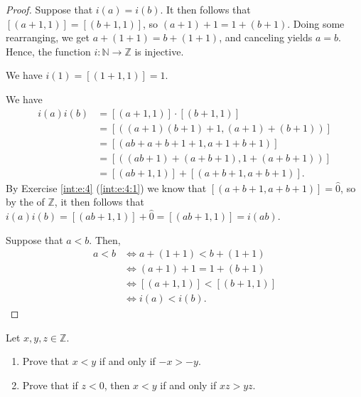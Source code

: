 \begin{proof}
	\hfill

	Suppose that $i(a) = i(b)$. It then follows that $[(a + 1, 1)] = [(b + 1, 1)]$, so $(a + 1) + 1 = 1 + (b + 1)$. Doing some rearranging, we get $a + (1 + 1) = b + (1 + 1)$, and canceling yields $a = b$. Hence, the function $i: \mathbb{N} \to \mathbb{Z}$ is injective.

	We have $i(1) = [(1 + 1, 1)] = \hat{1}$.

	We have
	\begin{align*}
		i(a)i(b) & = [(a + 1, 1)] \cdot [(b + 1, 1)]             \\
		         & = [((a + 1)(b + 1) + 1, (a + 1) + (b + 1))]   \\
		         & = [(ab + a + b + 1 + 1, a + 1 + b + 1)]       \\
		         & = [((ab + 1) + (a + b + 1), 1 + (a + b + 1))] \\
		         & = [(ab + 1, 1)] + [(a + b + 1, a + b + 1)].
	\end{align*}
	By Exercise \ref{int:e:4} (\ref{int:e:4:1}) we know that $[(a + b + 1, a + b + 1)] = \hat{0}$, so by the  of $\mathbb{Z}$, it then follows that $i(a)i(b) = [(ab + 1, 1)] + \hat{0} = [(ab + 1, 1)] = i(ab)$.

	Suppose that $a < b$. Then,
	\begin{align*}
		a < b & \iff a + (1 + 1) < b + (1 + 1)   \\
		      & \iff (a + 1) + 1 = 1 + (b + 1)   \\
		      & \iff [(a + 1, 1)] < [(b + 1, 1)] \\
		      & \iff i(a) < i(b).
	\end{align*}
\end{proof}


\Newpage
\begin{exercise} %
	\label{int:e:7}
	Let $x, y, z \in \mathbb{Z}$.
	\begin{enumerate}
		\item \label{int:e:7:1}
		      Prove that $x < y$ if and only if $ -x > -y$.
		\item \label{int:e:7:2}
		      Prove that if $z < 0$, then $x < y$ if and only if $x z > y z$.
	\end{enumerate}
\end{exercise}

